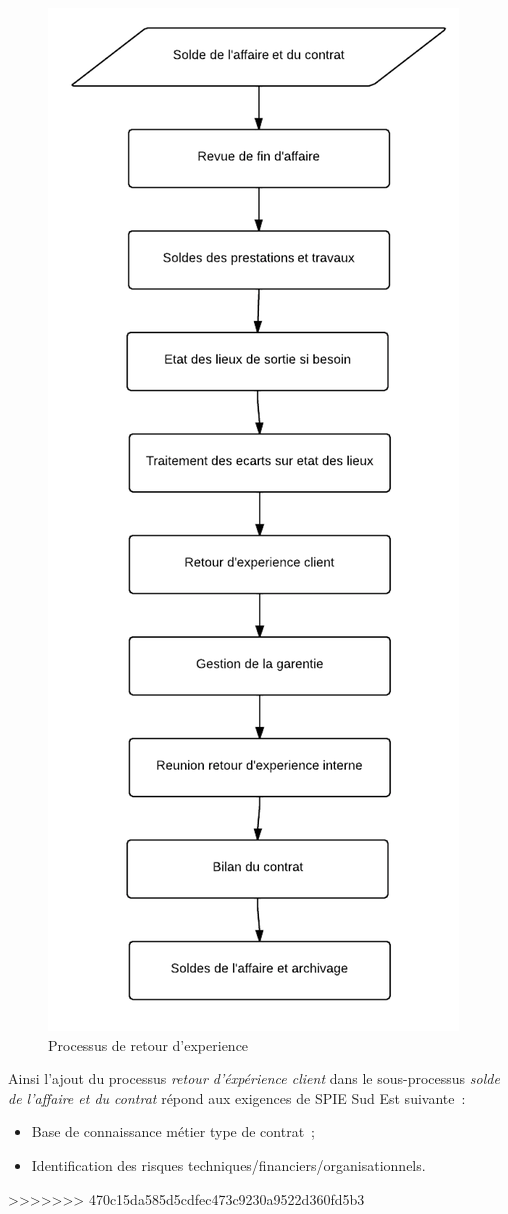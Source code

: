 \begin{figure}[h!]
	\centering
	\includegraphics[width=0.45\linewidth]{images/processus_retour_experience.png}
	\caption{Processus de retour d'experience}
	\label{fig:processusRetourExperience}
\end{figure}

Ainsi l'ajout du processus \textit{retour d'\'exp\'erience client} dans le sous-processus \textit{solde
de l'affaire et du contrat} r\'epond aux exigences de SPIE Sud Est suivante~:

\begin{itemize}
    \item Base de connaissance m\'etier type de contrat~;
    \item Identification des risques techniques/financiers/organisationnels.
\end{itemize}

>>>>>>> 470c15da585d5cdfec473c9230a9522d360fd5b3
